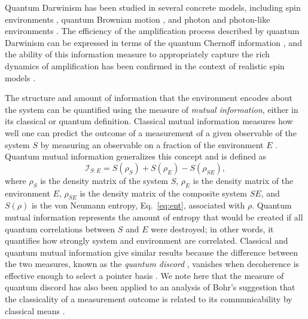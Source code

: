 \documentclass[3p,sort&compress,12pt]{elsarticle}
\newcommand{\op}[1]{#1}
\begin{document}
Quantum Darwinism has been studied in several concrete models, including spin environments \cite{Blume:2004:oo,Zwolak:2016:zz}, quantum Brownian motion \cite{Blume:2007:oo}, and photon and photon-like environments \cite{Riedel:2010:un,Riedel:2011:un,Zwolak:2014:tt}. The efficiency of the amplification process described by quantum Darwinism can be expressed in terms of the quantum Chernoff information \cite{Zwolak:2014:tt}, and the ability of this information measure to appropriately capture the rich dynamics of amplification has been confirmed in the context of realistic spin models \cite{Zwolak:2016:zz}. 

The structure and amount of information that the environment encodes about the system can be quantified using the measure of \emph{mutual information}, either in its classical \cite{Ollivier:2003:za,Ollivier:2004:im} or quantum \cite{Zurek:2002:ii,Blume:2004:oo,Blume:2005:oo} definition. Classical mutual information measures how well one can predict the outcome of a measurement of a given observable of the system $S$ by measuring an observable on a fraction of the environment $E$ \cite{Ollivier:2003:za,Ollivier:2004:im}. Quantum mutual information generalizes this concept and is defined as \cite{Zurek:2002:ii,Blume:2004:oo,Blume:2005:oo}
%
\begin{equation}
\mathcal{I}_{S:E} =S(\op{\rho}_S) + S(\op{\rho}_E) - S(\op{\rho}_{SE}),
\end{equation}
%
where $\op{\rho}_S$ is the density matrix of the system $S$, $\op{\rho}_E$ is the density matrix of the environment $E$, $\op{\rho}_{SE}$ is the density matrix of the composite system $SE$, and $S(\op{\rho})$ is the von Neumann entropy, Eq.~\eqref{eq:ent}, associated with $\op{\rho}$. Quantum mutual information represents the amount of entropy that would be created if all quantum correlations between $S$ and $E$ were destroyed; in other words, it quantifies how strongly system and environment are correlated. Classical and quantum mutual information give similar results \cite{Ollivier:2003:za,Ollivier:2004:im,Zurek:2002:ii,Blume:2004:oo,Blume:2005:oo} because the difference between the two measures, known as the \emph{quantum discord} \cite{Ollivier:2001:az}, vanishes when decoherence is effective enough to select a pointer basis \cite{Ollivier:2001:az}. We note here that the measure of quantum discord has also been applied to an analysis of Bohr's suggestion that the classicality of a measurement outcome is related to its communicability by classical means \cite{Streltsov:2013:oo}. 
\end{document}
